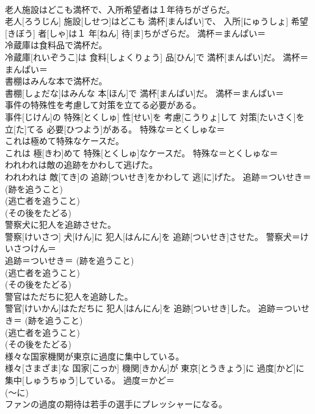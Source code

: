 \documentclass[8pt]{extreport}
\begin{document}
\begin{CJK}{UTF8}{min}
{\\	老人施設はどこも満杯で、入所希望者は１年待ちがざらだ。	
\\	老人[ろうじん] 施設[しせつ]はどこも 満杯[まんぱい]で、 入所[にゅうしょ] 希望[きぼう] 者[しゃ]は１ 年[ねん] 待[ま]ちがざらだ。	満杯＝まんぱい＝ 
\\	冷蔵庫は食料品で満杯だ。	
\\	冷蔵庫[れいぞうこ]は 食料[しょくりょう] 品[ひん]で 満杯[まんぱい]だ。	満杯＝まんぱい＝ 
\\	書棚はみんな本で満杯だ。	
\\	書棚[しょだな]はみんな 本[ほん]で 満杯[まんぱい]だ。	満杯＝まんぱい＝ 
\\	事件の特殊性を考慮して対策を立てる必要がある。	
\\	事件[じけん]の 特殊[とくしゅ] 性[せい]を 考慮[こうりょ]して 対策[たいさく]を 立[た]てる 必要[ひつよう]がある。	特殊な＝とくしゅな＝ 
\\	これは極めて特殊なケースだ。	
\\	これは 極[きわ]めて 特殊[とくしゅ]なケースだ。	特殊な＝とくしゅな＝ 
\\	われわれは敵の追跡をかわして逃げた。	
\\	われわれは 敵[てき]の 追跡[ついせき]をかわして 逃[に]げた。	追跡＝ついせき＝ (跡を追うこと) 
\\	(逃亡者を追うこと) 
\\	(その後をたどる) 
\\	警察犬に犯人を追跡させた。	
\\	警察[けいさつ] 犬[けん]に 犯人[はんにん]を 追跡[ついせき]させた。	警察犬＝けいさつけん＝ 
\\	追跡＝ついせき＝ (跡を追うこと) 
\\	(逃亡者を追うこと) 
\\	(その後をたどる) 
\\	警官はただちに犯人を追跡した。	
\\	警官[けいかん]はただちに 犯人[はんにん]を 追跡[ついせき]した。	追跡＝ついせき＝ (跡を追うこと) 
\\	(逃亡者を追うこと) 
\\	(その後をたどる) 
\\	様々な国家機関が東京に過度に集中している。	
\\	様々[さまざま]な 国家[こっか] 機関[きかん]が 東京[とうきょう]に 過度[かど]に 集中[しゅうちゅう]している。	過度＝かど＝ 
\\	(〜に) 
\\	ファンの過度の期待は若手の選手にプレッシャーになる。	
}
\end{CJK}
\end{document}

